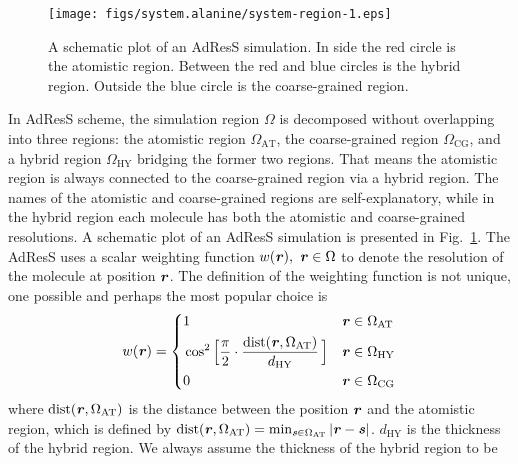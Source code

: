 \documentclass[epjST]{svjour}
\newcommand{\vect}[1]{\textbf{\textit{#1}}}
\newcommand{\dist}[0]{\textrm {dist}}
\newcommand{\AT}[0]{\textrm{AT}}
\newcommand{\HY}[0]{\textrm{HY}}
\newcommand{\CG}[0]{\textrm{CG}}
\begin{document}
\begin{figure}
  \centering
  \texttt{[image: figs/system.alanine/system-region-1.eps]}
  \caption{A schematic plot of an AdResS simulation. In side the red circle is the atomistic region. Between the red and blue circles is the hybrid region. Outside the blue circle is the coarse-grained region.}
  \label{fig:sys-region}
\end{figure}

In AdResS scheme, the simulation region $\Omega$ is 
decomposed without overlapping into three regions:
the atomistic region $\Omega_\AT$, the coarse-grained region $\Omega_\CG$, and
a hybrid region $\Omega_\HY$ bridging the former two regions.
That means the atomistic region is always connected to the coarse-grained region via a hybrid region.
The names of the atomistic and coarse-grained regions are self-explanatory, while
in the hybrid region each molecule has both the atomistic and coarse-grained resolutions.
A schematic plot of an AdResS simulation is presented in Fig.~\ref{fig:sys-region}.
The AdResS uses a scalar weighting function $w(\vect r),\ \vect r\in\Omega$ 
to denote the resolution of the molecule at position $\vect r$.
The definition of the weighting function
is not unique, one possible and perhaps the most popular choice is
\begin{equation}\label{eqn:old-w}
  w(\vect r) =
  \left\{
    \begin{alignedat}{3}
      &1 &\quad& \vect r \in \Omega_\AT\\
      &\cos^2\Big[\frac{\pi}{2 } \cdot \frac{\dist(\vect r, \Omega_\AT)}{d_\HY}\,\Big] && \vect r \in\Omega_\HY \\
      &0 &    & \vect r \in \Omega_\CG 
    \end{alignedat}
  \right.
\end{equation}
where $\dist(\vect r, \Omega_\AT)$ is the distance between the
position $\vect r$ and the atomistic region, which is defined
by $\dist(\vect r, \Omega_\AT) = \min_{\vect s\in\Omega_\AT} \vert
\vect r - \vect s \vert$.  $d_\HY$ is the thickness of the hybrid
region. We always assume the thickness of the hybrid region to be
\end{document}
